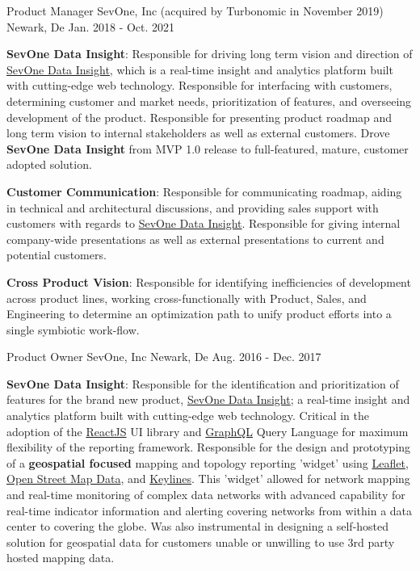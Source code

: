 \begin{cventries}
  \cventry
    {Product Manager}
    {SevOne, Inc (acquired by Turbonomic in November 2019)}
    {Newark, De}
    {Jan. 2018 - Oct. 2021}
    {
      \begin{cvitems}
        \item{\textbf{SevOne Data Insight}: Responsible for driving long term vision and direction of \href{https://www.sevone.com/sevone-data-insight}{SevOne Data Insight}, which is a real-time insight and analytics platform built with cutting-edge web technology.  Responsible for interfacing with customers, determining customer and market needs, prioritization of features, and overseeing development of the product.  Responsible for presenting product roadmap and long term vision to internal stakeholders as well as external customers.  Drove \textbf{SevOne Data Insight} from MVP 1.0 release to full-featured, mature, customer adopted solution.}
        \item{\textbf{Customer Communication}: Responsible for communicating roadmap, aiding in technical and architectural discussions, and providing sales support with customers with regards to \href{https://www.sevone.com/sevone-data-insight}{SevOne Data Insight}.  Responsible for giving internal company-wide presentations as well as external presentations to current and potential customers.}
        \item{\textbf{Cross Product Vision}: Responsible for identifying inefficiencies of development across product lines, working cross-functionally with Product, Sales, and Engineering to determine an optimization path to unify product efforts into a single symbiotic work-flow.}
      \end{cvitems}
    }

  \cventry
    {Product Owner}
    {SevOne, Inc}
    {Newark, De}
    {Aug. 2016 - Dec. 2017}
    {
      \begin{cvitems}
        \item{\textbf{SevOne Data Insight}: Responsible for the identification and prioritization of features for the brand new product, \href{https://www.sevone.com/sevone-data-insight}{SevOne Data Insight}; a real-time insight and analytics platform built with cutting-edge web technology.  Critical in the adoption of the \href{http://reactjs.org}{ReactJS} UI library and \href{http://graphql.org}{GraphQL} Query Language for maximum flexibility of the reporting framework. Responsible for the design and prototyping of a \textbf{geospatial focused} mapping and topology reporting 'widget' using \href{http://www.leaflet.org}{Leaflet}, \href{http://www.openstreetmap.org}{Open Street Map Data}, and \href{http://www.keylines.com}{Keylines}.  This 'widget' allowed for network mapping and real-time monitoring of complex data networks with advanced capability for real-time indicator information and alerting covering networks from within a data center to covering the globe. Was also instrumental in designing a self-hosted solution for geospatial data for customers unable or unwilling to use 3rd party hosted mapping data.}
      \end{cvitems}
    }


\end{cventries}
